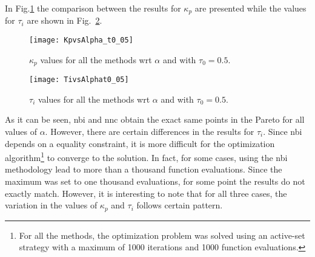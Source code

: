 In Fig.\ref{fig:KpvsAlpha_t0_05.pdf} the comparison between the results for $\kappa_p$ are presented while the values for $\tau_i$ are shown in Fig.~\ref{fig:TivsAlphat0_05}. 
%
\begin{figure}[tb]
\centering
\texttt{[image: KpvsAlpha\_t0\_05]}
\caption{$\kappa_p$ values for all the methods wrt $\alpha$ and with $\tau_0=0.5$.}
\label{fig:KpvsAlpha_t0_05.pdf}
\end{figure}
\begin{figure}[tb]
\centering
\texttt{[image: TivsAlphat0\_05]}
\caption{$\tau_i$ values for all the methods wrt $\alpha$ and with $\tau_0=0.5$.}
\label{fig:TivsAlphat0_05}
\end{figure}
%
As it can be seen, \gls{nbi} and \gls{nnc} obtain the exact same points in the Pareto for all values of $\alpha$. However, there are certain differences in the results for $\tau_i$. Since \gls{nbi} depends on a equality constraint, it is more difficult for the optimization algorithm\footnote{For all the methods, the optimization problem was solved using an active-set strategy with a maximum of 1000 iterations and 1000 function evaluations.} to converge to the solution. In fact, for some cases, using the \gls{nbi} methodology lead to more than a thousand function evaluations. Since the maximum was set to one thousand evaluations, for some point the results do not exactly match. However, it is interesting to note that for all three cases, the variation in the values of $\kappa_p$ and $\tau_i$ follows certain pattern. 

